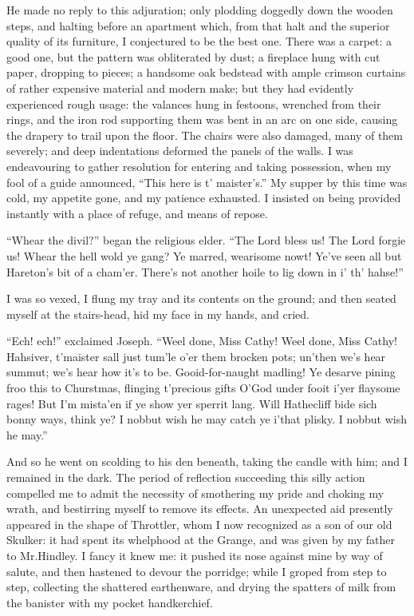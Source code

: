 \par He made no reply to this adjuration; only plodding doggedly down the wooden steps, and halting before an apartment which, from that halt and the superior quality of its furniture, I conjectured to be the best one. There was a carpet: a good one, but the pattern was obliterated by dust; a fireplace hung with cut paper, dropping to pieces; a handsome oak bedstead with ample crimson curtains of rather expensive material and modern make; but they had evidently experienced rough usage: the valances hung in festoons, wrenched from their rings, and the iron rod supporting them was bent in an arc on one side, causing the drapery to trail upon the floor. The chairs were also damaged, many of them severely; and deep indentations deformed the panels of the walls. I was endeavouring to gather resolution for entering and taking possession, when my fool of a guide announced, “This here is t' maister's.” My supper by this time was cold, my appetite gone, and my patience exhausted. I insisted on being provided instantly with a place of refuge, and means of repose.
\par “Whear the divil?” began the religious elder. “The Lord bless us! The Lord forgie us! Whear the hell wold ye gang? Ye marred, wearisome nowt! Ye've seen all but Hareton's bit of a cham'er. There's not another hoile to lig down in i' th' hahse!”
\par I was so vexed, I flung my tray and its contents on the ground; and then seated myself at the stairs-head, hid my face in my hands, and cried.
\par “Ech! ech!” exclaimed Joseph. “Weel done, Miss Cathy! Weel done, Miss Cathy! Hahsiver, t'maister sall just tum'le o'er them brocken pots; un'then we's hear summut; we's hear how it's to be. Gooid-for-naught madling! Ye desarve pining froo this to Churstmas, flinging t'precious gifts O'God under fooit i'yer flaysome rages! But I'm mista'en if ye show yer sperrit lang. Will Hathecliff bide sich bonny ways, think ye? I nobbut wish he may catch ye i'that plisky. I nobbut wish he may.”
\par And so he went on scolding to his den beneath, taking the candle with him; and I remained in the dark. The period of reflection succeeding this silly action compelled me to admit the necessity of smothering my pride and choking my wrath, and bestirring myself to remove its effects. An unexpected aid presently appeared in the shape of Throttler, whom I now recognized as a son of our old Skulker: it had spent its whelphood at the Grange, and was given by my father to Mr.Hindley. I fancy it knew me: it pushed its nose against mine by way of salute, and then hastened to devour the porridge; while I groped from step to step, collecting the shattered earthenware, and drying the spatters of milk from the banister with my pocket handkerchief.
